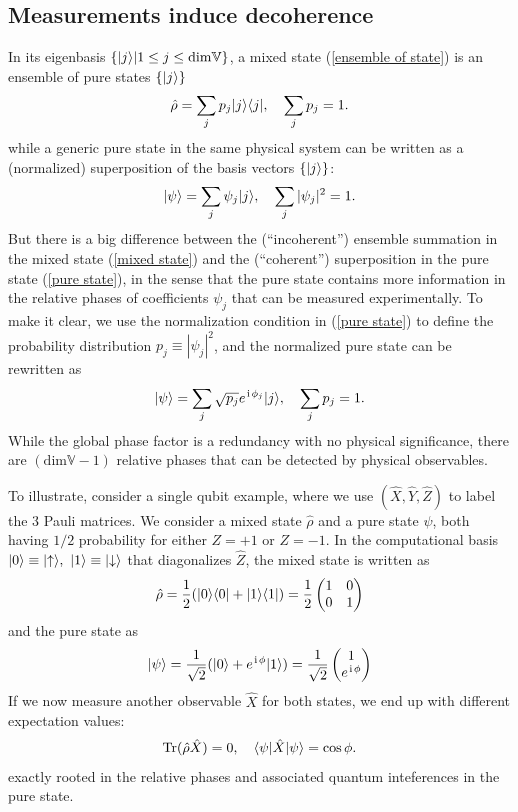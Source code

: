 \subsection{Measurements induce decoherence}


In its eigenbasis $\{|{j}\rangle|1\leq j\leq\text{dim}\mathbb{V}\}$, a mixed state (\ref{ensemble of state}) is an ensemble of pure states $\{|{j}\rangle\}$
\begin{align}\label{mixed state}
\hat\rho=\sum_{j}p_j|{j}\rangle\langle{j}|,~~~\sum_jp_j=1.
\end{align}
while a generic pure state in the same physical system can be written as a (normalized) superposition of the basis vectors $\{|{j}\rangle\}$:
\begin{align}\label{pure state}
|{\psi}\rangle=\sum_j\psi_j|{j}\rangle,~~~\sum_j|\psi_j|^2=1.
\end{align}
But there is a big difference between the (``incoherent'') ensemble summation in the mixed state (\ref{mixed state}) and the (``coherent'') superposition in the pure state (\ref{pure state}), in the sense that the pure state contains more information in the relative phases of coefficients $\psi_j$ that can be measured experimentally. To make it clear, we use the normalization condition in (\ref{pure state}) to define the probability distribution $p_j\equiv|\psi_j|^2$, and the normalized pure state can be rewritten as
\begin{align}\label{pure state:normalized}
|{\psi}\rangle=\sum_j\sqrt{p_j}e^{\hspace{1pt}\mathrm{i}\hspace{1pt}\phi_j}|{j}\rangle,~~~\sum_jp_j=1.
\end{align}
While the global phase factor is a redundancy with no physical significance, there are $(\text{dim}\mathbb{V}-1)$ relative phases that can be detected by physical observables. 

To illustrate, consider a single qubit example, where we use $(\hat X,\hat Y,\hat Z)$ to label the 3 Pauli matrices. We consider a mixed state $\hat\rho$ and a pure state $\psi$, both having $1/2$ probability for either $Z=+1$ or $Z=-1$. In the computational basis $|{0}\rangle\equiv|{\uparrow}\rangle,~|{1}\rangle\equiv|{\downarrow}\rangle$ that diagonalizes $\hat Z$, the mixed state is written as
\begin{align}
\hat\rho=\frac12(|{0}\rangle\langle{0}|+|{1}\rangle\langle{1}|)=\frac12\begin{pmatrix}1&0\\0&1\end{pmatrix}
\end{align}
and the pure state as
\begin{align}
|{\psi}\rangle=\frac1{\sqrt2}(|{0}\rangle+e^{\hspace{1pt}\mathrm{i}\hspace{1pt}\phi}|{1}\rangle)=\frac1{\sqrt2}\begin{pmatrix}1\\e^{\hspace{1pt}\mathrm{i}\hspace{1pt}\phi}\end{pmatrix}
\end{align}
If we now measure another observable $\hat X$ for both states, we end up with different expectation values:
\begin{align}
\operatorname{Tr}(\hat\rho\hat X)=0,~~~\langle{\psi|\hat X|\psi}\rangle=\cos\phi.
\end{align}
exactly rooted in the relative phases and associated quantum inteferences in the pure state.

